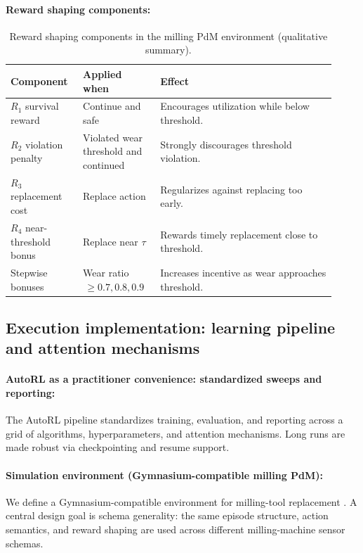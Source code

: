 \documentclass[sn-vancouver-num]{sn-jnl}%
\begin{document}
\paragraph{Reward shaping components:}
\begin{table}[htbp]
	\centering
	\caption{Reward shaping components in the milling PdM environment (qualitative summary).}
	\label{tab:reward_components}
	\begin{tabular}{L{0.20\linewidth} L{0.22\linewidth} L{0.50\linewidth}}
		\toprule
		\textbf{Component} & \textbf{Applied when} & \textbf{Effect}\\
		\midrule
		$R_1$ survival reward & Continue and safe & Encourages utilization while below threshold.\\
		$R_2$ violation penalty & Violated wear threshold and continued & Strongly discourages threshold violation.\\
		$R_3$ replacement cost & Replace action & Regularizes against replacing too early.\\
		$R_4$ near-threshold bonus & Replace near $\tau$ & Rewards timely replacement close to threshold.\\
		Stepwise bonuses & Wear ratio $\,\ge 0.7, 0.8, 0.9$ & Increases incentive as wear approaches threshold.\\
		\bottomrule
	\end{tabular}
\end{table}

\subsection{Execution implementation: learning pipeline and attention mechanisms}\label{sec:algo_desc}
\paragraph{AutoRL as a practitioner convenience: standardized sweeps and reporting:}\label{sec:autorl}
The AutoRL pipeline standardizes training, evaluation, and reporting across a grid of algorithms, hyperparameters, and attention mechanisms. Long runs are made robust via checkpointing and resume support.

\paragraph{Simulation environment (Gymnasium-compatible milling PdM):}
We define a Gymnasium-compatible environment for milling-tool replacement \cite{Foundation2023}. A central design goal is schema generality: the same episode structure, action semantics, and reward shaping are used across different milling-machine sensor schemas.
\end{document}
